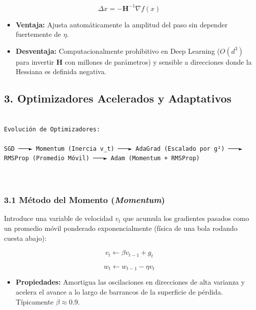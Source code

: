 \documentclass[11pt,oneside]{article}
\begin{document}
\[\Delta x = -\mathbf{H}^{-1} \nabla f(x)\]

\begin{itemize}

\item \textbf{Ventaja:} Ajusta automáticamente la amplitud del paso sin depender fuertemente de \(\eta\).

\end{itemize}

\begin{itemize}

\item \textbf{Desventaja:} Computacionalmente prohibitivo en Deep Learning (\(O(d^3)\) para invertir \(\mathbf{H}\) con millones de parámetros) y sensible a direcciones donde la Hessiana es definida negativa.

\end{itemize}

\subsection{3. Optimizadores Acelerados y Adaptativos}

\begin{lstlisting}

Evolución de Optimizadores:

SGD ───► Momentum (Inercia v_t) ───► AdaGrad (Escalado por g²) ───► RMSProp (Promedio Móvil) ───► Adam (Momentum + RMSProp)



\end{lstlisting}

\subsubsection{3.1 Método del Momento (\emph{Momentum})}

Introduce una variable de velocidad \(v_t\) que acumula los gradientes pasados como un promedio móvil ponderado exponencialmente (física de una bola rodando cuesta abajo):

\[v_t \leftarrow \beta v_{t-1} + g_t\]

\[w_t \leftarrow w_{t-1} - \eta v_t\]

\begin{itemize}

\item \textbf{Propiedades:} Amortigua las oscilaciones en direcciones de alta varianza y acelera el avance a lo largo de barrancos de la superficie de pérdida. Típicamente \(\beta \approx 0.9\).

\end{itemize}
\end{document}
